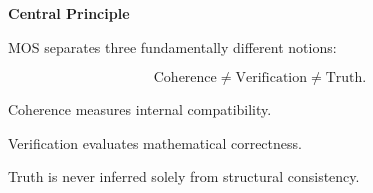 
\begin{remarkbox}

\BodyFont

\textbf{Central Principle}

MOS separates three fundamentally different notions:

\[
\boxed{
\text{Coherence}
\neq
\text{Verification}
\neq
\text{Truth}.
}
\]

Coherence measures internal compatibility.

Verification evaluates mathematical correctness.

Truth is never inferred solely from structural consistency.

\end{remarkbox}